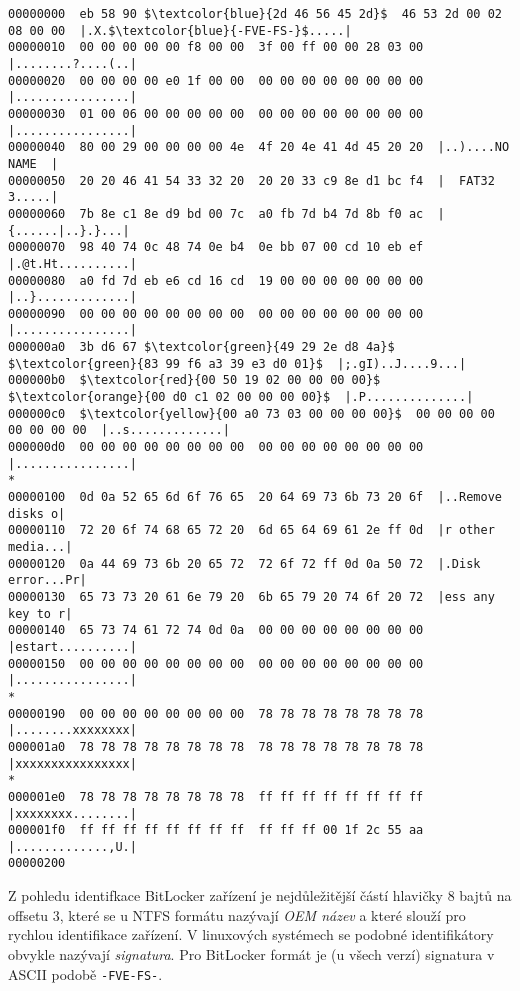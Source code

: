\begin{center}
\begin{lstlisting}[frame=none, escapechar=$, basicstyle=\ttfamily\small, columns=fullflexible, keepspaces=true, caption={BitLocker hlavička se zvýrazněnou signaturou, GUID a trojicí offsetů FVE metadat},label=lst:bitlocker-header]
00000000  eb 58 90 $\textcolor{blue}{2d 46 56 45 2d}$  46 53 2d 00 02 08 00 00  |.X.$\textcolor{blue}{-FVE-FS-}$.....|
00000010  00 00 00 00 00 f8 00 00  3f 00 ff 00 00 28 03 00  |........?....(..|
00000020  00 00 00 00 e0 1f 00 00  00 00 00 00 00 00 00 00  |................|
00000030  01 00 06 00 00 00 00 00  00 00 00 00 00 00 00 00  |................|
00000040  80 00 29 00 00 00 00 4e  4f 20 4e 41 4d 45 20 20  |..)....NO NAME  |
00000050  20 20 46 41 54 33 32 20  20 20 33 c9 8e d1 bc f4  |  FAT32   3.....|
00000060  7b 8e c1 8e d9 bd 00 7c  a0 fb 7d b4 7d 8b f0 ac  |{......|..}.}...|
00000070  98 40 74 0c 48 74 0e b4  0e bb 07 00 cd 10 eb ef  |.@t.Ht..........|
00000080  a0 fd 7d eb e6 cd 16 cd  19 00 00 00 00 00 00 00  |..}.............|
00000090  00 00 00 00 00 00 00 00  00 00 00 00 00 00 00 00  |................|
000000a0  3b d6 67 $\textcolor{green}{49 29 2e d8 4a}$  $\textcolor{green}{83 99 f6 a3 39 e3 d0 01}$  |;.gI)..J....9...|
000000b0  $\textcolor{red}{00 50 19 02 00 00 00 00}$  $\textcolor{orange}{00 d0 c1 02 00 00 00 00}$  |.P..............|
000000c0  $\textcolor{yellow}{00 a0 73 03 00 00 00 00}$  00 00 00 00 00 00 00 00  |..s.............|
000000d0  00 00 00 00 00 00 00 00  00 00 00 00 00 00 00 00  |................|
*
00000100  0d 0a 52 65 6d 6f 76 65  20 64 69 73 6b 73 20 6f  |..Remove disks o|
00000110  72 20 6f 74 68 65 72 20  6d 65 64 69 61 2e ff 0d  |r other media...|
00000120  0a 44 69 73 6b 20 65 72  72 6f 72 ff 0d 0a 50 72  |.Disk error...Pr|
00000130  65 73 73 20 61 6e 79 20  6b 65 79 20 74 6f 20 72  |ess any key to r|
00000140  65 73 74 61 72 74 0d 0a  00 00 00 00 00 00 00 00  |estart..........|
00000150  00 00 00 00 00 00 00 00  00 00 00 00 00 00 00 00  |................|
*
00000190  00 00 00 00 00 00 00 00  78 78 78 78 78 78 78 78  |........xxxxxxxx|
000001a0  78 78 78 78 78 78 78 78  78 78 78 78 78 78 78 78  |xxxxxxxxxxxxxxxx|
*
000001e0  78 78 78 78 78 78 78 78  ff ff ff ff ff ff ff ff  |xxxxxxxx........|
000001f0  ff ff ff ff ff ff ff ff  ff ff ff 00 1f 2c 55 aa  |.............,U.|
00000200
\end{lstlisting}
\end{center}

Z pohledu identifkace BitLocker zařízení je nejdůležitější částí hlavičky 8 bajtů na offsetu 3, které se u NTFS formátu nazývají \emph{OEM název} a které slouží pro rychlou identifikace zařízení. V linuxových systémech se podobné identifikátory obvykle nazývají \emph{signatura}.  Pro BitLocker formát je (u všech verzí) signatura v ASCII podobě \texttt{-FVE-FS-}.


